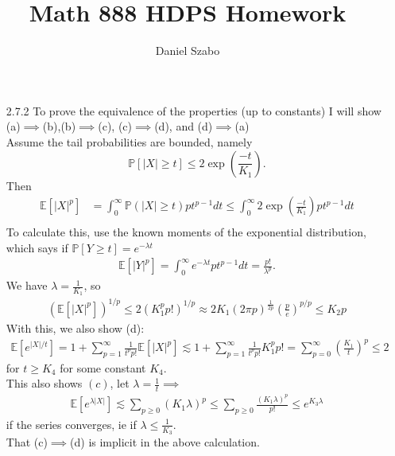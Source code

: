 \documentclass[11pt]{article}
\title{Math 888 HDPS Homework}
\author{Daniel Szabo}
\newcommand{\handout}[5]{
	\noindent
	\begin{center}
		\framebox{
			\vbox{
				\hbox to 5.78in { {\bf MATH888: High-dimensional probability and statistics } \hfill #2 }
				\vspace{4mm}
				\hbox to 5.78in { {\Large \hfill #5  \hfill} }
				\vspace{2mm}
				\hbox to 5.78in { {\em #3 \hfill #4} }
			}
		}
	\end{center}
	\vspace*{4mm}
}
\newcommand{\lecture}[4]{\handout{#1}{#2}{#3}{Scribe: #4}{Lecture #1}}
\def\Pp{\mathbb P}
\def\E{\mathbb E}
\begin{document}
	
	\maketitle
	
	\begin{enumerate}
		\item[2.7.2] To prove the equivalence of the properties (up to constants) I will show (a)$ \implies $(b),(b)$ \implies $(c), (c)$ \implies $(d), and (d)$ \implies $(a)\\
		Assume the tail probabilities are bounded, namely 
		\[ \Pp\left[ |X|\geq t \right] \leq 2\exp \left( \frac{-t}{K_1} \right). \]
		Then 
		\begin{align*}
			\E[|X|^p] &= \int_{0}^{\infty} \Pp(|X|\geq t)pt^{p-1}dt \leq \int_{0}^{\infty} 2\exp \left( \frac{-t}{K_1}\right) pt^{p-1}dt\\
		\end{align*}
	To calculate this, use the known moments of the exponential distribution, which says if $ \Pp[Y\geq t] = e^{-\lambda t} $
	\begin{align*}
		\E[|Y|^p] = \int_{0}^{\infty} e^{-\lambda t}pt^{p-1}dt = \frac{p!}{\lambda^p}.
	\end{align*}
	We have $ \lambda=\frac{1}{K_1} $, so 
	\begin{align*}
		(\E[|X|^p])^{1/p} \leq 2 \left( K_1^p p! \right)^{1/p} \approx 2K_1 (2\pi p)^{\frac{1}{2p}} \left( \frac{p}{e} \right)^{p/p} \leq K_2 p
	\end{align*}
	With this, we also show (d):
	\begin{align*}
		\E[e^{|X|/t}] = 1+\sum_{p=1}^{\infty}\frac{1}{t^p p!} \E[|X|^{p}] \lesssim 1 + \sum_{p=1}^{\infty}\frac{1}{t^p p!} K_1^p p! = \sum_{p=0}^{\infty} \left( \frac{K_1}{t} \right)^p \leq 2
	\end{align*}
	for $ t \geq K_4 $ for some constant $ K_4 $.\\
	This also shows $ (c) $, let $ \lambda = \frac{1}{t}\implies $
	\begin{align*}
		\E[e^{\lambda |X|}] \lesssim \sum_{p\geq 0} (K_1\lambda)^p \leq \sum_{p\geq 0} \frac{(K_1\lambda)^p}{p!} \leq e^{K_3\lambda}
	\end{align*}
	if the series converges, ie if $ \lambda \leq  \frac{1}{K_3} $.\\
	That (c)$ \implies $(d) is implicit in the above calculation.
	

\end{enumerate}
\end{document}
